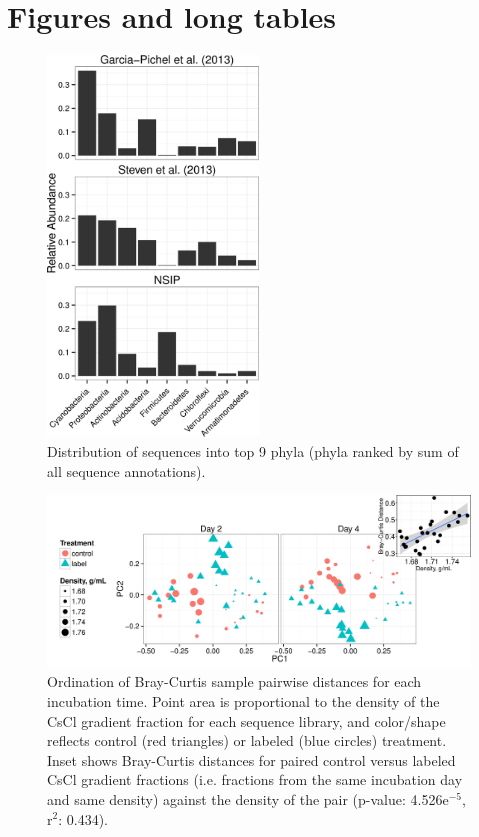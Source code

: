\section{Figures and long tables}



\begin{figure}[h!]
  \centering
    \includegraphics[width=0.5\textwidth]{figures/study_phylum_dist/study_phylum_dist.png}
  \caption{Distribution of sequences into top 9 phyla (phyla ranked by sum of all sequence annotations).}
  \label{fig:study_phy_dist}
\end{figure}

\begin{figure}[h!]
  \centering
  \includegraphics[width=1.0\textwidth]{figures/ordination_all_day_facet/ordination_day_facet_w_inset.png}
  \caption{Ordination of Bray-Curtis sample pairwise distances for each incubation time. Point area is proportional to the density of the CsCl gradient fraction for each sequence library, and color/shape reflects control (red triangles) or labeled (blue circles) treatment. Inset shows Bray-Curtis distances for paired control versus labeled CsCl gradient fractions (i.e. fractions from the same incubation day and same density) against the density of the pair (p-value: 4.526e$^{-5}$, r$^{2}$: 0.434).}
  \label{fig:ordination}
\end{figure}

